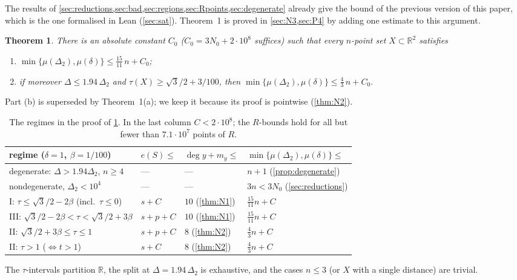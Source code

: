 \documentclass[11pt]{amsart}
\newtheorem{theorem}{Theorem}[section]
\theoremstyle{definition}
\theoremstyle{remark}
\newcommand{\R}{\mathbb{R}}
\newcommand{\Dt}{\Delta_2}
\newcommand{\mult}{\mu}
\begin{document}
The results of \cref{sec:reductions,sec:bad,sec:regions,sec:Rpoints,sec:degenerate} already give the bound of the previous version of this paper, which is the one formalised in Lean (\cref{sec:sat}). Theorem~1 is proved in \cref{sec:N3,sec:P4} by adding one estimate to this argument.

\begin{theorem}\label{thm:main15}
There is an absolute constant $C_0$ ($C_0=3N_0+2\cdot10^8$ suffices) such that every $n$-point set $X\subset\R^2$ satisfies
\begin{enumerate}[label=\textup{(\alph*)}]
\item $\min\{\mult(\Dt),\mult(\delta)\}\le\tfrac{15}{11}\,n+C_0$;
\item if moreover $\Delta\le1.94\,\Dt$ and $\tau(X)\ge\sqrt3/2+3/100$, then $\min\{\mult(\Dt),\mult(\delta)\}\le\tfrac43\,n+C_0$.
\end{enumerate}
\end{theorem}
Part (b) is superseded by Theorem~1(a); we keep it because its proof is pointwise (\cref{thm:N2}).

\begin{table}[ht]
\centering\small
\renewcommand{\arraystretch}{1.2}
\begin{tabular}{@{}llll@{}}
\toprule
regime ($\delta=1$, $\beta=1/100$) & $e(S)\le$ & $\deg y+m_y\le$ & $\min\{\mult(\Dt),\mult(\delta)\}\le$\\
\midrule
degenerate: $\Delta>1.94\Dt$, $n\ge4$ & --- & --- & $n+1$ (\cref{prop:degenerate})\\
nondegenerate, $\Dt<10^4$ & --- & --- & $3n<3N_0$ (\cref{sec:reductions})\\
I: $\tau\le\sqrt3/2-2\beta$ (incl.\ $\tau\le0$) & $s+C$ & $10$ (\cref{thm:N1}) & $\frac{15}{11}n+C$\\
III: $\sqrt3/2-2\beta<\tau<\sqrt3/2+3\beta$ & $s+p+C$ & $10$ (\cref{thm:N1}) & $\frac{15}{11}n+C$\\
II: $\sqrt3/2+3\beta\le\tau\le1$ & $s+p+C$ & $8$ (\cref{thm:N2}) & $\frac43n+C$\\
II: $\tau>1$ ($\Leftrightarrow t>1$) & $s+C$ & $8$ (\cref{thm:N2}) & $\frac43n+C$\\
\bottomrule
\end{tabular}
\caption{The regimes in the proof of \cref{thm:main15}. In the last column $C<2\cdot10^8$; the $R$-bounds hold for all but fewer than $7.1\cdot10^7$ points of $R$.}
\end{table}

The $\tau$-intervals partition $\R$, the split at $\Delta=1.94\,\Dt$ is exhaustive, and the cases $n\le3$ (or $X$ with a single distance) are trivial.
\end{document}
